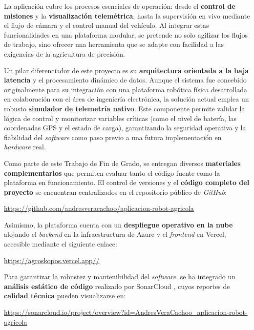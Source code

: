 
La aplicación cubre los procesos esenciales de operación: desde el \textbf{control de misiones} y la \textbf{visualización telemétrica}, hasta la supervisión en vivo mediante el flujo de cámara y el control manual del vehículo. Al integrar estas funcionalidades en una plataforma modular, se pretende no solo agilizar los flujos de trabajo, sino ofrecer una herramienta que se adapte con facilidad a las exigencias de la agricultura de precisión.

Un pilar diferenciador de este proyecto es su \textbf{arquitectura orientada a la baja latencia} y el procesamiento dinámico de datos. Aunque el sistema fue concebido originalmente para su integración con una plataforma robótica física desarrollada en colaboración con el área de ingeniería electrónica, la solución actual emplea un robusto \textbf{simulador de telemetría nativo}. Este componente permite validar la lógica de control y monitorizar variables críticas (como el nivel de batería, las coordenadas GPS y el estado de carga), garantizando la seguridad operativa y la fiabilidad del \textit{software} como paso previo a una futura implementación en \textit{hardware} real.

Como parte de este Trabajo de Fin de Grado, se entregan diversos \textbf{materiales complementarios} que permiten evaluar tanto el código fuente como la plataforma en funcionamiento. El control de versiones y el \textbf{código completo del proyecto} se encuentran centralizados en el repositorio público de \textit{GitHub}:

\begin{center}
    \url{https://github.com/andresveracachoo/aplicacion-robot-agricola}
\end{center}

Asimismo, la plataforma cuenta con un \textbf{despliegue operativo en la nube} alojando el \textit{backend} en la infraestructura de Azure y el \textit{frontend} en Vercel, accesible mediante el siguiente enlace:

\begin{center}
    \url{https://agroskopos.vercel.app//}
\end{center}

Para garantizar la robustez y mantenibilidad del \textit{software}, se ha integrado un \textbf{análisis estático de código} realizado por SonarCloud \cite{sonarqube}, cuyos reportes de \textbf{calidad técnica} pueden visualizarse en:

\begin{center}
    \url{https://sonarcloud.io/project/overview?id=AndresVeraCachoo_aplicacion-robot-agricola}
\end{center}
